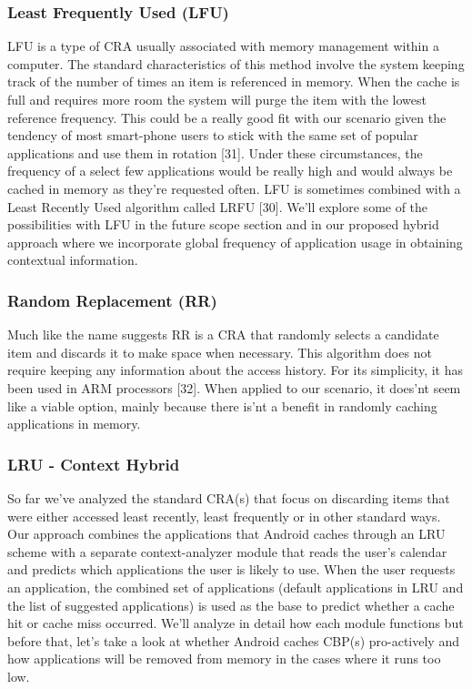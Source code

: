 \documentclass[12pt]{uthesis-v12}  %
\begin{document}
			\subsubsection{Least Frequently Used (LFU)}
				LFU is a type of CRA usually associated with memory management within a computer. The standard characteristics of this method involve the system keeping track of the number of times an item is referenced in memory. When the cache is full and requires more room the system will purge the item with the lowest reference frequency. This could be a really good fit with our scenario given the tendency of most smart-phone users to stick with the same set of popular applications and use them in rotation [31]. Under these circumstances, the frequency of a select few applications would be really high and would always be cached in memory as they're requested often. LFU is sometimes combined with a Least Recently Used algorithm called LRFU [30]. We'll explore some of the possibilities with LFU in the future scope section and in our proposed hybrid approach where we incorporate global frequency of application usage in obtaining contextual information.
				 
			\subsubsection{Random Replacement (RR)}
				Much like the name suggests RR is a CRA that randomly selects a candidate item and discards it to make space when necessary. This algorithm does not require keeping any information about the access history. For its simplicity, it has been used in ARM processors [32]. When applied to our scenario, it does'nt seem like a viable option, mainly because there is'nt a benefit in randomly caching applications in memory.
				 
			\subsubsection{LRU - Context Hybrid}
				So far we've analyzed the standard CRA(s) that focus on discarding items that were either accessed least recently, least frequently or in other standard ways. Our approach combines the applications that Android caches through an LRU scheme with a separate context-analyzer module that reads the user's calendar and predicts which applications the user is likely to use. When the user requests an application, the combined set of applications (default applications in LRU and the list of suggested applications) is used as the base to predict whether a cache hit or cache miss occurred. We'll analyze in detail how each module functions but before that, let's take a look at whether Android caches CBP(s) pro-actively and how applications will be removed from memory in the cases where it runs too low.
				
\end{document}
